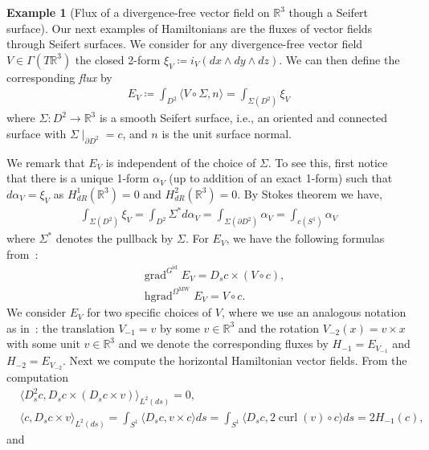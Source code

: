 \documentclass[12pt]{amsart}
\theoremstyle{definition}
\newtheorem{example}[theorem]{Example}
\newcommand{\R}{\mathbb R}
\newcommand{\id}{\mathrm{id}}
\newcommand{\OmMW}{\Omega^{\operatorname{MW}}}
\def\x{\times}
\def\R{{\mathbb R}}
\let\on=\operatorname
\begin{document}
\begin{example}[Flux of a divergence-free vector field on $\R^3$ though a Seifert surface]\label{eg:flux}
Our next examples of Hamiltonians are the fluxes of vector fields through Seifert surfaces. We consider
 for any divergence-free vector field \(V\in\Gamma(T \R^3)\) the closed 2-form \(\xi_V\coloneqq i_V( dx\wedge dy\wedge dz)\). 
 We can then define the corresponding \emph{flux} by 
\begin{align*}
E_V \coloneqq\int_{D^2} \langle V\circ \Sigma, n\rangle= \int_{\Sigma(D^2)} \xi_V
\end{align*}
where $\Sigma\colon D^2 \to \R^3$ is a smooth Seifert surface, i.e., an oriented and connected surface with $\Sigma\mid_{\partial D^2}=c$, and $n$ is the unit surface normal. 

We remark that $E_V$ is independent of the choice of $\Sigma$. 
To see this, first notice that there is a unique 1-form \(\alpha_V\) (up to addition of an exact 1-form) such that \(d\alpha_V = \xi_V\)  as  $H^1_{dR}(\R^3)=0$ and $H^2_{dR}(\R^3)=0$. By Stokes theorem we have,
\begin{align*}
    \int_{\Sigma(D^2)} \xi_V= \int_{D^2}  \Sigma^*d\alpha_V 
=\int_{\Sigma(\partial D^2)}\alpha_V
=\int_{c(S^1)} \alpha_V
\end{align*}
where $\Sigma^*$ denotes the pullback by $\Sigma$. 
For \(E_V\), we have the following formulas from~\cite[Theorem 4]{chern_knöppel_pedit_pinkall_2020}:
\begin{align*}
    &\on{grad}^{G^\id} E_V = D_s c\times(V\circ c),\\
    &\on{hgrad}^{\OmMW} E_V= V\circ c.
\end{align*}
We consider $E_V$ for two specific choices of \(V\), where we use an analogous notation as in~\cite{chern_knöppel_pedit_pinkall_2020}: the translation \(V_{-1}=v\) by some \(v\in\R^3\) and the rotation \(V_{-2}(x)=v\times x\) with some unit \(v\in\R^3\) and we denote the corresponding fluxes by  \(H_{-1}=E_{V_{-1}}\) and \(H_{-2}=E_{V_{-2}}\). 
Next we compute the horizontal Hamiltonian vector fields. From the computation
\begin{align}
    &\langle D^2_s c, D_s c\x ( D_s c \x v) \rangle_{L^2(ds)}=0,\\
    &\langle c, D_s c \x v \rangle_{L^2(ds)}
    =\int_{S^1} \langle D_s c, v\x c \rangle ds = \int_{S^1} \langle D_s c, 2 \on{curl}(v)\circ c\rangle ds =  2H_{-1}(c),
\end{align}
and 
\begin{align}

\end{align}
\end{example}
\end{document}
